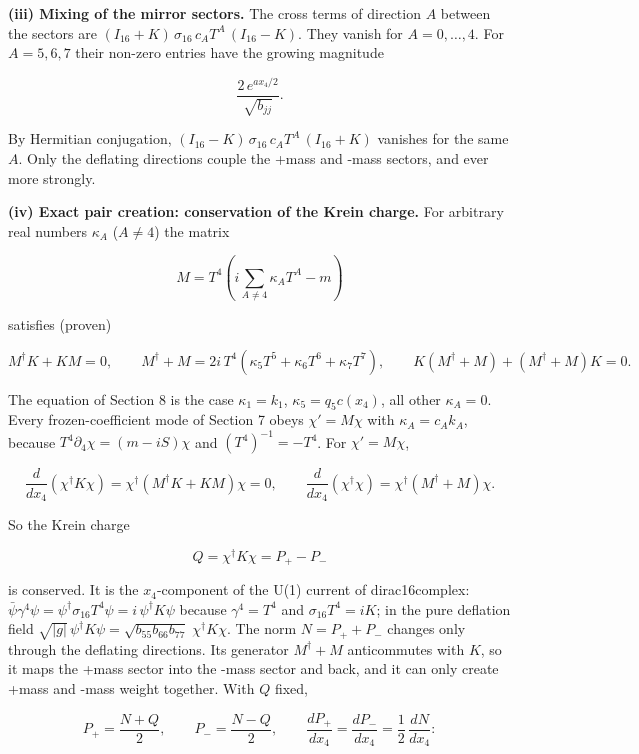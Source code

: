 \documentclass[10pt]{article}
\makeatletter
\newcommand\keepnext{\par\nopagebreak\@nobreaktrue\everypar{\@nobreakfalse\everypar{}}}
\makeatother
\begin{document}
\textbf{(iii) Mixing of the mirror sectors.} The cross terms of direction $A$ between the sectors are $(I_{16} + K)\,\sigma_{16}\,c_AT^A\,(I_{16} - K)$. They vanish for $A = 0, \dots, 4$. For $A = 5, 6, 7$ their non-zero entries have the growing magnitude\keepnext


\[
\frac{2\,e^{ax_4/2}}{\sqrt{b_{jj}}} .
\]

By Hermitian conjugation, $(I_{16} - K)\,\sigma_{16}\,c_AT^A\,(I_{16} + K)$ vanishes for the same $A$. Only the deflating directions couple the +mass and -mass sectors, and ever more strongly.


\textbf{(iv) Exact pair creation: conservation of the Krein charge.} For arbitrary real numbers $\kappa_A$ ($A \ne 4$) the matrix\keepnext


\[
M = T^4\left(i\sum_{A \ne 4}\kappa_AT^A - m\right)
\]

satisfies (proven)\keepnext


\[
M^\dagger K + KM = 0, \qquad M^\dagger + M = 2i\,T^4\left(\kappa_5T^5 + \kappa_6T^6 + \kappa_7T^7\right), \qquad K\left(M^\dagger + M\right) + \left(M^\dagger + M\right)K = 0 .
\]

The equation of Section 8 is the case $\kappa_1 = k_1$, $\kappa_5 = q_5c(x_4)$, all other $\kappa_A = 0$. Every frozen-coefficient mode of Section 7 obeys $\chi' = M\chi$ with $\kappa_A = c_Ak_A$, because $T^4\partial_4\chi = (m - iS)\chi$ and $(T^4)^{-1} = -T^4$. For $\chi' = M\chi$,\keepnext


\[
\frac{d}{dx_4}\left(\chi^\dagger K\chi\right) = \chi^\dagger\left(M^\dagger K + KM\right)\chi = 0, \qquad \frac{d}{dx_4}\left(\chi^\dagger\chi\right) = \chi^\dagger\left(M^\dagger + M\right)\chi .
\]

So the Krein charge\keepnext


\[
Q = \chi^\dagger K\chi = P_+ - P_-
\]

is conserved. It is the $x_4$-component of the U(1) current of dirac16complex: $\bar\psi\gamma^4\psi = \psi^\dagger\sigma_{16}T^4\psi = i\,\psi^\dagger K\psi$ because $\gamma^4 = T^4$ and $\sigma_{16}T^4 = iK$; in the pure deflation field $\sqrt{\lvert g\rvert}\,\psi^\dagger K\psi = \sqrt{b_{55}b_{66}b_{77}}\;\chi^\dagger K\chi$. The norm $N = P_+ + P_-$ changes only through the deflating directions. Its generator $M^\dagger + M$ anticommutes with $K$, so it maps the +mass sector into the -mass sector and back, and it can only create +mass and -mass weight together. With $Q$ fixed,\keepnext


\[
P_+ = \frac{N + Q}{2}, \qquad P_- = \frac{N - Q}{2}, \qquad \frac{dP_+}{dx_4} = \frac{dP_-}{dx_4} = \frac12\,\frac{dN}{dx_4} :
\]
\end{document}
